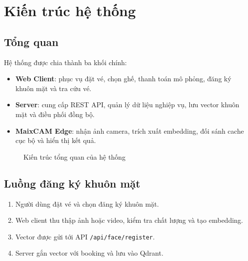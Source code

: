 \section{Kiến trúc hệ thống}

\subsection{Tổng quan}
Hệ thống được chia thành ba khối chính:

\begin{itemize}
  \item \textbf{Web Client}: phục vụ đặt vé, chọn ghế, thanh toán mô phỏng, đăng ký khuôn mặt và tra cứu vé.
  \item \textbf{Server}: cung cấp REST API, quản lý dữ liệu nghiệp vụ, lưu vector khuôn mặt và điều phối đồng bộ.
  \item \textbf{MaixCAM Edge}: nhận ảnh camera, trích xuất embedding, đối sánh cache cục bộ và hiển thị kết quả.
\end{itemize}

\begin{figure}[H]
  \centering
  \caption{Kiến trúc tổng quan của hệ thống}
  \label{fig:system-overview}
\end{figure}

\subsection{Luồng đăng ký khuôn mặt}
\begin{enumerate}
  \item Người dùng đặt vé và chọn đăng ký khuôn mặt.
  \item Web client thu thập ảnh hoặc video, kiểm tra chất lượng và tạo embedding.
  \item Vector được gửi tới API \texttt{/api/face/register}.
  \item Server gắn vector với booking và lưu vào Qdrant.
\end{enumerate}

